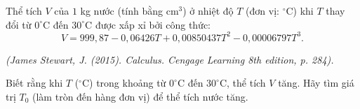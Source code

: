 \begin{bt}%
	Thể tích $V$ của $1$ kg nước (tính bằng cm$^3$) ở nhiệt độ $T$ (đơn vị: $^\circ$C) khi $T$ thay đổi từ $0^\circ$C đến $30^\circ$C được xấp xỉ bởi công  thức:
	 \[V=999{,}87-0{,}06426T+0{,}00850437T^{2}-0{,}00006797T^{3}.\]
	\begin{flushright}
		\textit{(James Stewart, J.  (2015). Calculus. Cengage Learning 8th edition, p. 284).}
	\end{flushright}
	Biết rằng khi $T$ ($^\circ$C) trong khoảng từ $0^\circ$C đến $30^\circ$C, thể tích $V$ tăng. Hãy tìm  giá trị $T_0$ (làm tròn đến hàng đơn vị) để thể tích nước tăng.
\end{bt}

